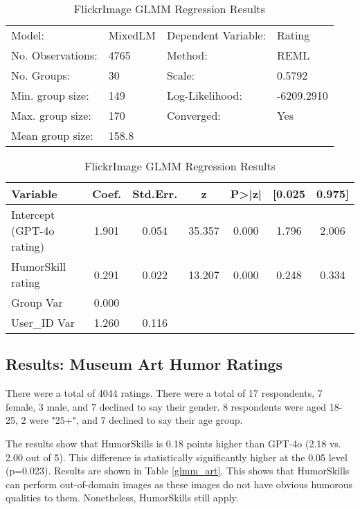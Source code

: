\begin{table}
\caption{FlickrImage GLMM Regression Results}
\label{glmm_flickr}
\begin{center}
\begin{tabular}{llll}
\hline
Model:            & MixedLM & Dependent Variable: & Rating       \\
No. Observations: & 4765    & Method:             & REML         \\
No. Groups:       & 30      & Scale:              & 0.5792       \\
Min. group size:  & 149     & Log-Likelihood:     & -6209.2910   \\
Max. group size:  & 170     & Converged:          & Yes          \\
Mean group size:  & 158.8   &                     &              \\
\hline
\end{tabular}

\vspace{0.5cm}

\begin{tabular}{lcccccc}
\hline
\textbf{Variable} & \textbf{Coef.} & \textbf{Std.Err.} & \textbf{z} & \textbf{P>|z|} & \textbf{[0.025} & \textbf{0.975]} \\
\hline
Intercept (GPT-4o rating)      & 1.901  & 0.054  & 35.357 & 0.000 & 1.796 & 2.006 \\
HumorSkill rating   & 0.291  & 0.022  & 13.207 & 0.000 & 0.248 & 0.334 \\
Group Var      & 0.000  &        &        &       &       &       \\
User\_ID Var   & 1.260  & 0.116  &        &       &       &       \\
\hline
\end{tabular}
\end{center}
\end{table}

\subsection{Results: Museum Art Humor Ratings}
There were a total of 4044 ratings. There were a total of 17 respondents, 7 female, 3 male, and 7 declined to say their gender. 8 respondents were aged 18-25, 2 were "25+", and 7 declined to say their age group.

The results show that HumorSkills is 0.18 points higher than GPT-4o (2.18 vs. 2.00 out of 5). This difference is statistically significantly higher at the 0.05 level (p=0.023). Results are shown in Table \ref{glmm_art}. This shows that HumorSkills can perform out-of-domain images as these images do not have obvious humorous qualities to them. Nonetheless, HumorSkills still apply.

